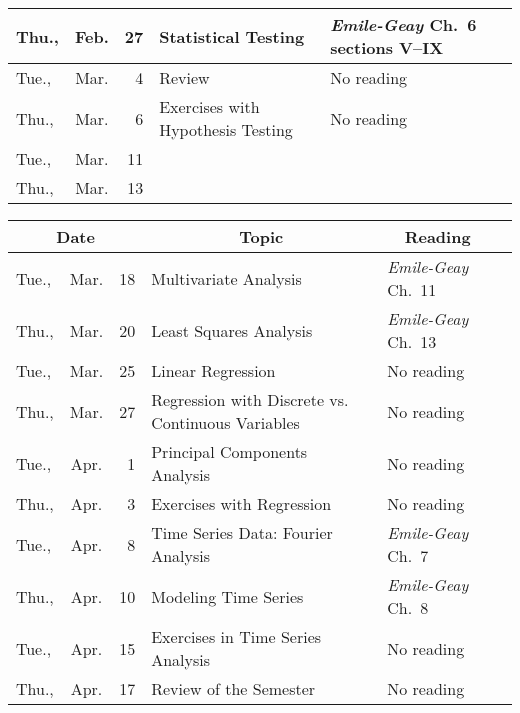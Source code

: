 \documentclass[11pt,twoside]{jgsyllabus}\usepackage[]{graphicx}\usepackage[]{xcolor}
\begin{document}
\begin{center}
\begin{tabular}{l@{~}c@{~}r>{\raggedright}m{2.6in}>{\centering}m{2in}c}
   \midrule
Thu., & Feb. &  27 & Statistical Testing & \emph{Emile-Geay\/} Ch.~6 sections V--IX &  \\
   \midrule
Tue., & Mar. &   4 & Review & No reading &  \\
   \midrule
Thu., & Mar. &   6 & Exercises with Hypothesis Testing & No reading &  \\
   \midrule
Tue., & Mar. &  11 & \multicolumn{2}{l}{\multirow{2}{*}{\bfseries\scshape\Large Spring Break}} & \\%
  Thu., & Mar. &  13 &  &  &  \\
   \bottomrule
\end{tabular}

\end{center}
\clearpage

\begin{center}
\begin{tabular}{l@{~}c@{~}r>{\raggedright}m{2.6in}>{\centering}m{2in}c}
  \toprule
  \multicolumn{3}{c}{\bfseries Date} & \multicolumn{1}{c}{\bfseries Topic} &\multicolumn{1}{c}{\bfseries Reading} &\\
 \midrule
Tue., & Mar. &  18 & Multivariate Analysis & \emph{Emile-Geay\/} Ch.~11 &  \\
   \midrule
Thu., & Mar. &  20 & Least Squares Analysis & \emph{Emile-Geay\/} Ch.~13 &  \\
   \midrule
Tue., & Mar. &  25 & Linear Regression & No reading &  \\
   \midrule
Thu., & Mar. &  27 & Regression with Discrete vs. Continuous Variables & No reading &  \\
   \midrule
Tue., & Apr. &   1 & Principal Components Analysis & No reading &  \\
   \midrule
Thu., & Apr. &   3 & Exercises with Regression & No reading &  \\
   \midrule
Tue., & Apr. &   8 & Time Series Data: Fourier Analysis & \emph{Emile-Geay\/} Ch.~7 &  \\
   \midrule
Thu., & Apr. &  10 & Modeling Time Series & \emph{Emile-Geay\/} Ch.~8 &  \\
   \midrule
Tue., & Apr. &  15 & Exercises in Time Series Analysis & No reading &  \\
   \midrule
Thu., & Apr. &  17 & Review of the Semester & No reading &  \\
   \bottomrule
\end{tabular}

\end{center}
%
\end{document}
